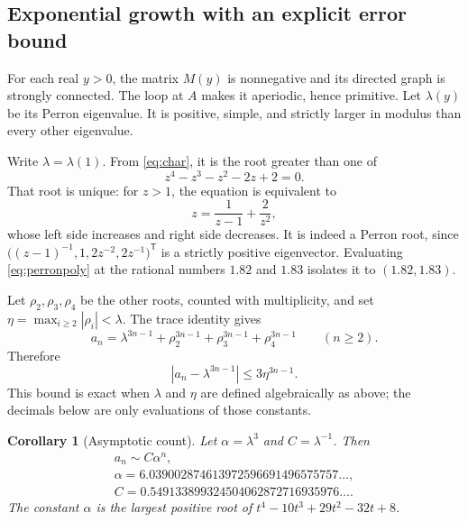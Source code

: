 \documentclass[11pt,a4paper]{article}
\newtheorem{corollary}[theorem]{Corollary}
\theoremstyle{definition}
\begin{document}
\subsection{Exponential growth with an explicit error bound}

For each real $y>0$, the matrix $M(y)$ is nonnegative and its directed graph
is strongly connected. The loop at $A$ makes it aperiodic, hence primitive.
Let $\lambda(y)$ be its Perron eigenvalue. It is positive, simple, and
strictly larger in modulus than every other eigenvalue.

Write $\lambda=\lambda(1)$. From \cref{eq:char}, it is the root greater
than one of
\begin{equation}
 z^4-z^3-z^2-2z+2=0.
 \label{eq:perronpoly}
\end{equation}
That root is unique: for $z>1$, the equation is equivalent to
\begin{equation}
 z=\frac1{z-1}+\frac2{z^2},
 \label{eq:perronequation}
\end{equation}
whose left side increases and right side decreases. It is indeed a Perron
root, since $\bigl((z-1)^{-1},1,2z^{-2},2z^{-1}\bigr)^\mathsf T$ is a
strictly positive eigenvector. Evaluating \cref{eq:perronpoly} at the
rational numbers $1.82$ and $1.83$ isolates it to $(1.82,1.83)$.

Let $\rho_2,\rho_3,\rho_4$ be the other roots, counted with multiplicity,
and set $\eta=\max_{i\ge2}|\rho_i|<\lambda$. The trace identity gives
\begin{equation}
 a_n=\lambda^{3n-1}+\rho_2^{3n-1}+\rho_3^{3n-1}+\rho_4^{3n-1}
 \qquad(n\ge2).
 \label{eq:spectralexact}
\end{equation}
Therefore
\begin{equation}
 \left|a_n-\lambda^{3n-1}\right|\le3\eta^{3n-1}.
 \label{eq:spectralerror}
\end{equation}
This bound is exact when $\lambda$ and $\eta$ are defined algebraically as
above; the decimals below are only evaluations of those constants.

\begin{corollary}[Asymptotic count]
\label{cor:asymptotic}
Let $\alpha=\lambda^3$ and $C=\lambda^{-1}$. Then
\begin{equation}
 \begin{gathered}
 a_n\sim C\alpha^n,\\
 \alpha=6.039002874613972596691496575757\ldots,\\
 C=0.549133899324504062872716935976\ldots.
 \end{gathered}
 \label{eq:asymptotic}
\end{equation}
The constant $\alpha$ is the largest positive root of
$t^4-10t^3+29t^2-32t+8$.
\end{corollary}
\end{document}
